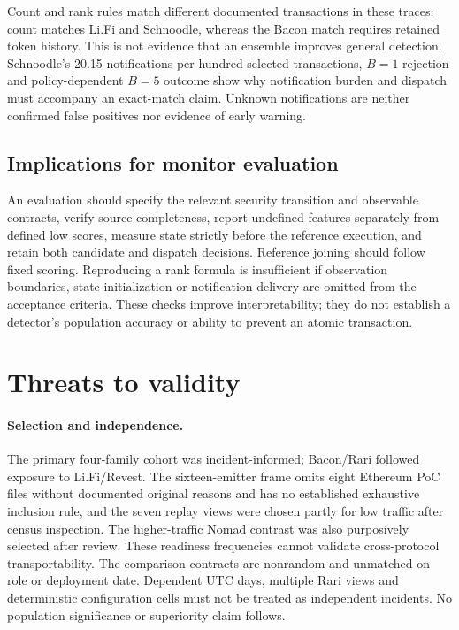 \documentclass[preprint,12pt,authoryear]{elsarticle}
\begin{document}
Count and rank rules match different documented transactions in these traces: count matches Li.Fi and Schnoodle, whereas the Bacon match requires retained token history. This is not evidence that an ensemble improves general detection. Schnoodle's 20.15 notifications per hundred selected transactions, $B=1$ rejection and policy-dependent $B=5$ outcome show why notification burden and dispatch must accompany an exact-match claim. Unknown notifications are neither confirmed false positives nor evidence of early warning.

\subsection{Implications for monitor evaluation}
An evaluation should specify the relevant security transition and observable contracts, verify source completeness, report undefined features separately from defined low scores, measure state strictly before the reference execution, and retain both candidate and dispatch decisions. Reference joining should follow fixed scoring. Reproducing a rank formula is insufficient if observation boundaries, state initialization or notification delivery are omitted from the acceptance criteria. These checks improve interpretability; they do not establish a detector's population accuracy or ability to prevent an atomic transaction.

\section{Threats to validity}\label{sec:validity}
\paragraph{Selection and independence.} The primary four-family cohort was incident-informed; Bacon/Rari followed exposure to Li.Fi/Revest. The sixteen-emitter frame omits eight Ethereum PoC files without documented original reasons and has no established exhaustive inclusion rule, and the seven replay views were chosen partly for low traffic after census inspection. The higher-traffic Nomad contrast was also purposively selected after review. These readiness frequencies cannot validate cross-protocol transportability. The comparison contracts are nonrandom and unmatched on role or deployment date. Dependent UTC days, multiple Rari views and deterministic configuration cells must not be treated as independent incidents. No population significance or superiority claim follows.
\end{document}

